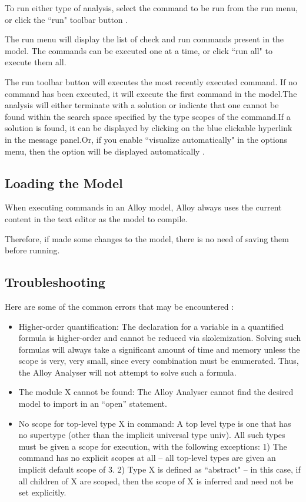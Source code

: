 \documentclass[a4paper,12pt]{report}
\begin{document}
\begin{onehalfspacing}
To run either type of analysis, select the command to be run from the run menu, or click the ``run" toolbar button \cite{DanielJackson2004}.

The run menu will display the list of check and run commands present in the model. The commands can be executed one at a time, or click ``run all" to execute them all.

The run toolbar button will executes the most recently executed command. If no command has been executed, it will execute the first command in the model.The analysis will either terminate with a solution or indicate that one cannot be found within the search space specified by the type scopes of the command.If a solution is found, it can be displayed by clicking on the blue clickable hyperlink in the message panel.Or, if you enable ``visualize automatically" in the options menu, then the option will be displayed automatically \cite{DanielJackson2004}.

\subsection{Loading the Model}
\label{Model loading}

When executing commands in an Alloy model, Alloy always uses the current content in the text editor as the model to compile.

Therefore, if made some changes to the model, there is no need of saving them before running.

\subsection{Troubleshooting}
\label{Troubleshoot}

Here are some of the common errors that may be encountered \cite{DanielJackson2004}:
\begin{itemize}
\item Higher-order quantification: The declaration for a variable in a quantified formula is higher-order and cannot be reduced via skolemization. Solving such formulas will always take a significant amount of time and memory unless the scope is very, very small, since every combination must be enumerated. Thus, the Alloy Analyser will not attempt to solve such a formula.
\item The module X cannot be found: The Alloy Analyser cannot find the desired model to import in an ``open” statement.
\item No scope for top-level type X in command: A top level type is one that has no supertype (other than the implicit universal type univ). All such types must be given a scope for execution, with the following exceptions: 1) The command has no explicit scopes at all – all top-level types are given an implicit default scope of 3.
2) Type X is defined as ``abstract" – in this case, if all children of X are scoped, then the scope of X is inferred and need not be set explicitly.
\end{itemize}


\end{onehalfspacing}
\end{document}
